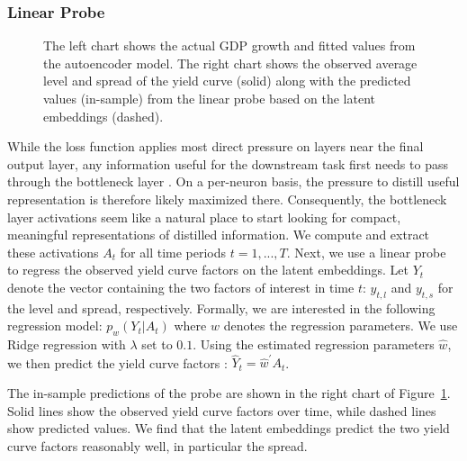 \documentclass{article}
\theoremstyle{plain}
\theoremstyle{definition}
\theoremstyle{remark}
\begin{document}
\subsubsection{Linear Probe}\label{linear-probe}

\begin{figure}


\caption{\label{fig-dl-results}The left chart shows the actual GDP growth
and fitted values from the autoencoder model. The right chart shows the
observed average level and spread of the yield curve (solid) along with
the predicted values (in-sample) from the linear probe based on the latent embeddings
(dashed).}

\end{figure}%

While the loss function applies most direct pressure on layers near the final output layer, any information useful for the downstream task first needs to pass through the bottleneck layer \citep{alain2018understanding}. On a per-neuron basis, the pressure to distill useful representation is therefore likely maximized there. Consequently, the bottleneck layer activations seem like a natural place to start looking for compact, meaningful representations of distilled information.  We compute and extract these activations \(A_t\) for all time periods \(t=1,...,T\). Next, we use a linear probe to regress the observed
yield curve factors on the latent embeddings. Let \(Y_t\) denote the vector containing the two factors of interest in time \(t\): \(y_{t,l}\) and \(y_{t,s}\) for the level and spread, respectively. Formally, we are interested in the following regression model: \(p_{w}(Y_t|A_t)\) where \(w\) denotes the regression
parameters. We use Ridge regression with \(\lambda\) set to \(0.1\). Using the estimated regression parameters \(\hat{w}\), we then predict the yield curve factors%
: \(\hat{Y}_t=\hat{w}^{\prime}A_t\).

The in-sample predictions of the probe are shown in the right chart of Figure~\ref{fig-dl-results}. Solid lines show the observed yield curve factors over time, while dashed lines show predicted values. We find that the latent embeddings predict the two yield curve factors reasonably well, in particular the spread. %
\end{document}
